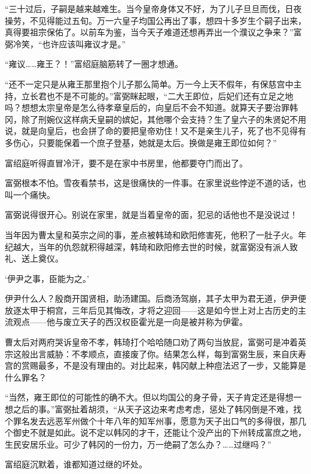 “三十过后，子嗣是越来越难生。当今皇帝身体又不好，为了儿子旦旦而伐，日夜操劳，不见得能过五旬。万一六皇子均国公再出了事，想四十多岁生个嗣子出来，真得要祖宗保佑了。以前车为鉴，当今天子难道还想再弄出一个濮议之争来？”富弼冷笑，“也许应该叫雍议才是。”

“雍议……雍王？！”富绍庭脑筋转了一圈才想通。

“还不一定只是从雍王那里抱个儿子那么简单。万一今上天不假年，有保慈宫中主持，立长君也不是不可能的。”富弼眯起眼，“二大王即位，后妃们还有立足之地吗？想想太宗皇帝是怎么待孝章皇后的，向皇后不会不知道。就算天子要治罪韩冈，除了刑婉仪这样病夭皇嗣的嫔妃，其他哪个会支持？生了皇六子的朱贤妃不用说，就是向皇后，也会拼了命的要把皇帝劝住！又不是亲生儿子，死了也不见得有多伤心，只要能保着一个庶子登基，她就是太后。换做是雍王即位如何？”

富绍庭听得直冒冷汗，要不是在家中书房里，他都要夺门而出了。

富弼根本不怕。雪夜看禁书，这是很痛快的一件事。在家里说些悖逆不道的话，也叫一个痛快。

富弼说得很开心。别说在家里，就是当着皇帝的面，犯忌的话他也不是没说过！

当年因为曹太皇和英宗之间的事，差点被韩琦和欧阳修害死，他积了一肚子火。年纪越大，当年的仇怨就积得越深，韩琦和欧阳修去世的时候，就富弼没有派人致礼、送上奠仪。

‘伊尹之事，臣能为之。’

伊尹什么人？殷商开国贤相，助汤建国。后商汤驾崩，其子太甲为君无道，伊尹便放逐太甲于桐宫，三年后见其悔改，才将之迎回——这是如今世上对上古历史的主流观点——他与废立天子的西汉权臣霍光是一向是被并称为伊霍。

曹太后对两府哭诉皇帝不孝，韩琦打个哈哈随口劝了两句当放屁，富弼可是冲着英宗这般出言威胁：不孝顺点，直接废了你。结果怎么样，每到富弼生辰，来自庆寿宫的赏赐最多，不是没有理由的。对比起来，韩冈献上种痘法迟了一步，又能算是什么罪名？

“当然，雍王即位的可能性的确不大。但以均国公的身子骨，天子肯定还是得想一想之后的事。”富弼扯着胡须，“从天子这边来考虑考虑，惩处了韩冈倒是不难，找个罪名发去远恶军州做个十年八年的知军州事，愿意为天子出口气的多得很，那几个御史不就是如此。说不定以韩冈的才干，还能让个没产出的下州转成富庶之地，生民安居乐业。可少了韩冈的一份力，万一绝嗣了怎么办？……过继吗？”

富绍庭沉默着，谁都知道过继的坏处。

